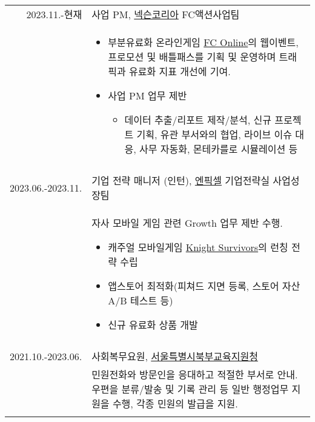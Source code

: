 \documentclass[a4paper]{article} %
\begin{document}
\begin{tabular}{r|p{11cm}}

    \textsc{2023.11.-현재} & 사업 PM, \href{https://company.nexon.com/ko/}{넥슨코리아} FC액션사업팀 \\
    &\footnotesize{\vspace{-2mm}
        \begin{itemize}
            \item 부분유료화 온라인게임 \href{https://fconline.nexon.com}{FC Online}의 웹이벤트, 프로모션 및 배틀패스를
        기획 및 운영하며 트래픽과 유료화 지표 개선에 기여. 
    \item 사업 PM 업무 제반
        \begin{itemize}
            \item 데이터 추출/리포트 제작/분석, 신규 프로젝트 기획, 유관 부서와의 협업,
                라이브 이슈 대응, 사무 자동화, 몬테카를로 시뮬레이션 등
        \end{itemize}
\end{itemize}
\vspace{-5mm}
    }\\
    \multicolumn{2}{c}{} \\
	
    \textsc{2023.06.-2023.11.} & 기업 전략 매니저 (인턴),
\href{https://npixel.co.kr/}{엔픽셀} 기업전략실 사업성장팀 \\
&\footnotesize{
    자사 모바일 게임 관련 Growth 업무 제반 수행.
    \begin{itemize}
        \item 캐주얼 모바일게임 \href{https://pixelcraft.metapixel.io/}{Knight Survivors}의 런칭 전략 수립
        \item 앱스토어 최적화(피쳐드 지면 등록, 스토어 자산 A/B 테스트 등)
        \item 신규 유료화 상품 개발
    \end{itemize}\vspace{-5mm}
} \\
	\multicolumn{2}{c}{} \\
	
	\textsc{2021.10.-2023.06.} & 사회복무요원, \href{http://bbedu.sen.go.kr}{\textsc{서울특별시북부교육지원청}} \emph{}\\
	&\footnotesize{민원전화와 방문인을 응대하고 적절한 부서로 안내. 우편을 분류/발송 및 기록 관리 등 일반 행정업무 지원을 수행, 각종 민원의 발급을 지원.}\\
	\multicolumn{2}{c}{} \\
	

\end{tabular}
\end{document}
